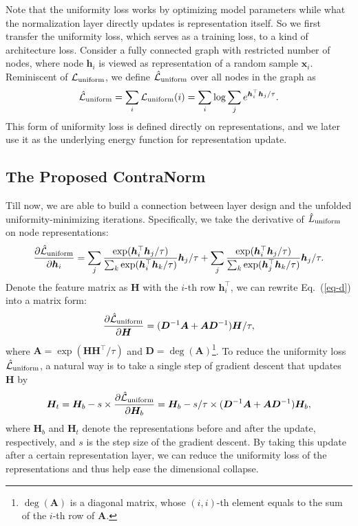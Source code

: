 \documentclass{article}
\def\vh{{\bm{h}}}
\def\vx{{\bm{x}}}
\def\mA{{\bm{A}}}
\def\mD{{\bm{D}}}
\def\mH{{\bm{H}}}
\newcommand{\Ls}{\mathcal{L}}
\theoremstyle{definition}
\theoremstyle{remark}
\theoremstyle{theorem}
\begin{document}
Note that the uniformity loss works by optimizing model parameters while what the normalization layer directly updates is representation itself. So we first transfer the uniformity loss, which serves as a training loss, to a kind of architecture loss. Consider a fully connected graph with restricted number of nodes, where node $\vh_i$ is viewed as representation of a random sample $\vx_i$. Reminiscent of $\Ls_{\rm{uniform}}$, we define $\hat{\Ls}_{\rm{uniform}}$ over all nodes in the graph as
\begin{equation}
     \hat{\Ls}_{\rm{uniform}} = \sum_i \Ls_{\rm{uniform}}(i) = \sum_i \log \sum_j e^{\vh_i^{\top}\vh_j / \tau}. \label{eq:uniform-graph}
\end{equation}
This form of uniformity loss is defined directly on representations, and we later use it as the underlying energy function for representation update.  

\subsection{The Proposed ContraNorm} \label{section:contranorm}
Till now, we are able to build a connection between layer design and the unfolded uniformity-minimizing iterations. Specifically, we take the derivative of $\hat{L}_{\rm{uniform}}$ on node representations:
\begin{equation} \label{eq-d}
    \frac{\partial \hat{\Ls}_{\rm{uniform}}}{\partial \vh_i} 
    = \sum_j \frac{\exp(\vh_i^{\top} \vh_j/\tau)}{\sum_k \exp(\vh_i^{\top} \vh_k/\tau)} \vh_j/\tau + \sum_j \frac{\exp(\vh_i ^{\top}\vh_j/\tau)}{\sum_k \exp(\vh_j ^{\top}\vh_k/\tau)} \vh_j/\tau.
\end{equation}
Denote the feature matrix as $\mH$ with the $i$-th row $\vh_i^{\top}$, we can rewrite Eq.~(\ref{eq-d}) into a matrix form:
\begin{equation} \label{eq-m}
    \frac{\partial \hat{\Ls}_{\rm{uniform}}}{\partial \mH} = (\mD^{-1}\mA + \mA\mD^{-1})\mH/\tau,
\end{equation}
where $\mA = \exp(\mH\mH^{\top}/\tau)$ and $\mD = \deg (\mA)$\footnote{$\deg(\mA)$ is a diagonal matrix, whose $(i,i)$-th element equals to the sum of the $i$-th row of $\mA$.}. To reduce the uniformity loss $\hat{\Ls}_{\rm{uniform}}$, a natural way is to take a single step of gradient descent that updates $\mH$ by
\begin{equation} \label{eq-contra}
    \mH_t = \mH_b - s\times\frac{\partial \hat{\Ls}_{\rm{uniform}}}{\partial \mH_b}=\mH_b - s/\tau \times (\mD^{-1}\mA + \mA\mD^{-1})\mH_b,
\end{equation}
where $\mH_b$ and $\mH_t$ denote the representations before and after the update, respectively, and $s$ is the step size of the gradient descent. By taking this update after a certain representation layer, we can reduce the uniformity loss of the representations and thus help ease the dimensional collapse.
\end{document}
